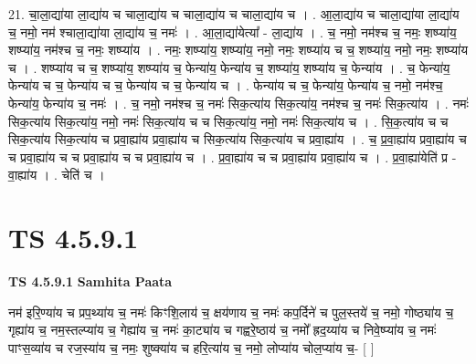 \documentclass[17pt]{extarticle}
\begin{document}
21. चा॒ला॒द्या॑या ला॒द्या॑य च चाला॒द्या॑य च चाला॒द्या॑य च चाला॒द्या॑य च । . आ॒ला॒द्या॑य च चाला॒द्या॑या ला॒द्या॑य च॒ नमो॒ नम॑ श्चाला॒द्या॑या ला॒द्या॑य च॒ नमः॑ । . आ॒ला॒द्या॑येत्या᳚ - ला॒द्या॑य । . च॒ नमो॒ नम॑श्च च॒ नमः॒ शष्प्या॑य॒ शष्प्या॑य॒ नम॑श्च च॒ नमः॒ शष्प्या॑य । . नमः॒ शष्प्या॑य॒ शष्प्या॑य॒ नमो॒ नमः॒ शष्प्या॑य च च॒ शष्प्या॑य॒ नमो॒ नमः॒ शष्प्या॑य च । . शष्प्या॑य च च॒ शष्प्या॑य॒ शष्प्या॑य च॒ फेन्या॑य॒ फेन्या॑य च॒ शष्प्या॑य॒ शष्प्या॑य च॒ फेन्या॑य । . च॒ फेन्या॑य॒ फेन्या॑य च च॒ फेन्या॑य च च॒ फेन्या॑य च च॒ फेन्या॑य च । . फेन्या॑य च च॒ फेन्या॑य॒ फेन्या॑य च॒ नमो॒ नम॑श्च॒ फेन्या॑य॒ फेन्या॑य च॒ नमः॑ । . च॒ नमो॒ नम॑श्च च॒ नमः॑ सिक॒त्या॑य सिक॒त्या॑य॒ नम॑श्च च॒ नमः॑ सिक॒त्या॑य । . नमः॑ सिक॒त्या॑य सिक॒त्या॑य॒ नमो॒ नमः॑ सिक॒त्या॑य च च सिक॒त्या॑य॒ नमो॒ नमः॑ सिक॒त्या॑य च । . सि॒क॒त्या॑य च च सिक॒त्या॑य सिक॒त्या॑य च प्रवा॒ह्या॑य प्रवा॒ह्या॑य च सिक॒त्या॑य सिक॒त्या॑य च प्रवा॒ह्या॑य । . च॒ प्र॒वा॒ह्या॑य प्रवा॒ह्या॑य च च प्रवा॒ह्या॑य च च प्रवा॒ह्या॑य च च प्रवा॒ह्या॑य च । . प्र॒वा॒ह्या॑य च च प्रवा॒ह्या॑य प्रवा॒ह्या॑य च । . प्र॒वा॒ह्या॑येति॑ प्र - वा॒ह्या॑य । . चेति॑ च । \newline
\pagebreak
{}

\section{ TS 4.5.9.1 }

\textbf{TS 4.5.9.1 } \newline
\textbf{Samhita Paata} \newline

नम॑ इरि॒ण्या॑य च प्रप॒थ्या॑य च॒ नमः॑ किꣳशि॒लाय॑ च॒ क्षय॑णाय च॒ नमः॑ कप॒र्दिने॑ च पुल॒स्तये॑ च॒ नमो॒ गोष्ठ्या॑य च॒ गृह्या॑य च॒ नम॒स्तल्प्या॑य च॒ गेह्या॑य च॒ नमः॑ का॒ट्या॑य च गह्वरे॒ष्ठाय॑ च॒ नमो᳚ ह्रद॒य्या॑य च निवे॒ष्प्या॑य च॒ नमः॑ पाꣳस॒व्या॑य च रज॒स्या॑य च॒ नमः॒ शुष्क्या॑य च हरि॒त्या॑य च॒ नमो॒ लोप्या॑य चोल॒प्या॑य च॒- [  ] \newline
\end{document}
